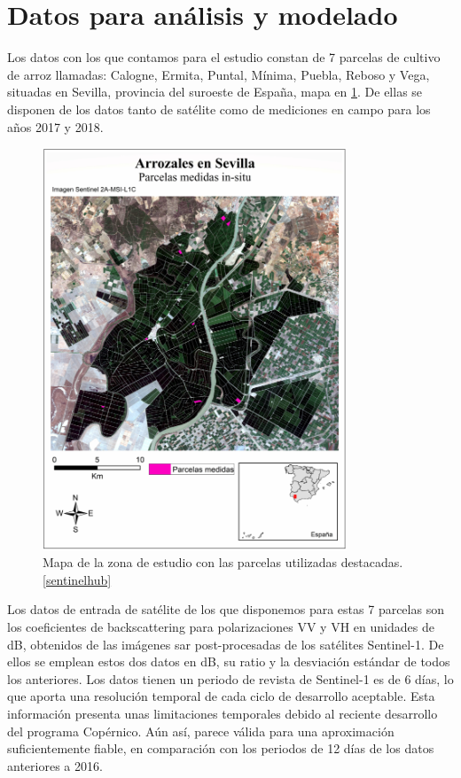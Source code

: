 \section{Datos para análisis y modelado}
\par Los datos con los que contamos para el estudio constan de 7 parcelas de cultivo de arroz llamadas: Calogne, Ermita, Puntal, Mínima, Puebla, Reboso y Vega, situadas en Sevilla, provincia del suroeste de España, mapa en \ref{fig:parcel}. De ellas se disponen de los datos tanto de satélite como de mediciones en campo para los años 2017 y 2018. 
\\
\begin{figure}[h]
    \centering
    \includegraphics[height=12cm]{archivos/tfg/parcel_sat} %
    \caption{Mapa de la zona de estudio con las parcelas utilizadas destacadas.\ref{sentinelhub}}
    \label{fig:parcel}
\end{figure}
\par Los datos de entrada de satélite de los que disponemos para estas 7 parcelas son los coeficientes de backscattering para polarizaciones VV y VH en unidades de dB, obtenidos de las imágenes \gls{sar} post-procesadas de los satélites Sentinel-1. De ellos se emplean estos dos datos en dB, su ratio y la desviación estándar de todos los anteriores. Los datos tienen un periodo de revista de Sentinel-1 es de 6 días, lo que aporta una resolución temporal de cada ciclo de desarrollo aceptable. Esta información presenta unas limitaciones temporales debido al reciente desarrollo del programa Copérnico. Aún así, parece válida para una aproximación suficientemente fiable, en comparación con los periodos de 12 días de los datos anteriores a 2016.
